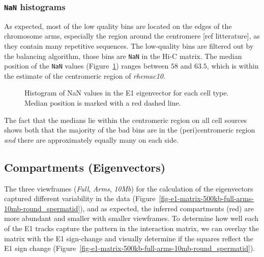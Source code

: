 \documentclass[
  11pt,
  a4paper,
]{scrbook}
\let\oldemph\emph
\renewcommand\emph[1]{\oldemph{\color{gray}#1}}
\begin{document}
\subsubsection{\texorpdfstring{\texttt{NaN}
histograms}{NaN histograms}}\label{nan-histograms}

As expected, most of the low quality bins are located on the edges of
the chromosome arms, especially the region around the centromere {[}ref
litterature{]}, as they contain many repetitive sequences. The
low-quality bins are filtered out by the balancing algorithm, those bins
are \texttt{NaN} in the Hi-C matrix. The median position of the
\texttt{NaN} values (Figure~\ref{fig-e1_nan_hist}) ranges between \(58\)
and \(63.5\), which is within the estimate of the centromeric region of
\emph{rhemac10}.

\begin{figure}[H]


\caption{\label{fig-e1_nan_hist}Histogram of NaN values in the E1
eigenvector for each cell type. Median position is marked with a red
dashed line.}

\end{figure}%

The fact that the medians lie within the centromeric region on all cell
sources shows both that the majority of the bad bins are in the
(peri)centromeric region \emph{and} there are approximately equally many
on each side.

\subsection{Compartments
(Eigenvectors)}\label{compartments-eigenvectors}

The three viewframes (\emph{Full}, \emph{Arms}, \emph{10Mb}) for the
calculation of the eigenvectors captured different variability in the
data (Figure~\ref{fig-e1-matrix-500kb-full-arms-10mb-round_spermatid}),
and as expected, the inferred compartments (red) are more abundant and
smaller with smaller viewframes. To determine how well each of the E1
tracks capture the pattern in the interaction matrix, we can overlay the
matrix with the E1 sign-change and visually determine if the squares
reflect the E1 sign change
(Figure~\ref{fig-e1-matrix-500kb-full-arms-10mb-round_spermatid}).
\end{document}
